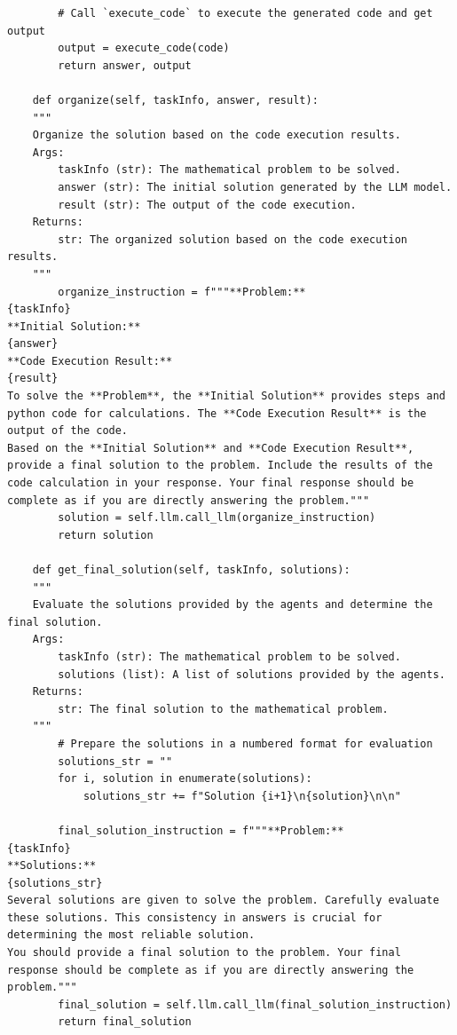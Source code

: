 \documentclass{article}
\theoremstyle{plain}
\theoremstyle{definition}
\theoremstyle{remark}
\begin{document}
\begin{lstlisting}
        # Call `execute_code` to execute the generated code and get output
        output = execute_code(code)
        return answer, output
    
    def organize(self, taskInfo, answer, result):
    """
    Organize the solution based on the code execution results.
    Args:
        taskInfo (str): The mathematical problem to be solved.
        answer (str): The initial solution generated by the LLM model.
        result (str): The output of the code execution.
    Returns:
        str: The organized solution based on the code execution results.
    """
        organize_instruction = f"""**Problem:**
{taskInfo}
**Initial Solution:**
{answer}
**Code Execution Result:**
{result}
To solve the **Problem**, the **Initial Solution** provides steps and python code for calculations. The **Code Execution Result** is the output of the code.
Based on the **Initial Solution** and **Code Execution Result**, provide a final solution to the problem. Include the results of the code calculation in your response. Your final response should be complete as if you are directly answering the problem."""
        solution = self.llm.call_llm(organize_instruction)
        return solution

    def get_final_solution(self, taskInfo, solutions):
    """
    Evaluate the solutions provided by the agents and determine the final solution.
    Args:
        taskInfo (str): The mathematical problem to be solved.
        solutions (list): A list of solutions provided by the agents.
    Returns:
        str: The final solution to the mathematical problem.
    """
        # Prepare the solutions in a numbered format for evaluation
        solutions_str = ""
        for i, solution in enumerate(solutions):
            solutions_str += f"Solution {i+1}\n{solution}\n\n"
            
        final_solution_instruction = f"""**Problem:**
{taskInfo}
**Solutions:**
{solutions_str}
Several solutions are given to solve the problem. Carefully evaluate these solutions. This consistency in answers is crucial for determining the most reliable solution.
You should provide a final solution to the problem. Your final response should be complete as if you are directly answering the problem.""" 
        final_solution = self.llm.call_llm(final_solution_instruction)
        return final_solution
\end{lstlisting}
\end{document}
